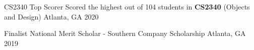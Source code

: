 




\begin{cvhonors}


\cvhonor
{CS2340 Top Scorer} %
{Scored the highest out of 104 students in \textbf{CS2340} (Objects and Design)} %
{Atlanta, GA} %
{2020} %

\cvhonor
{Finalist} %
{National Merit Scholar - Southern Company Scholarship} %
{Atlanta, GA} %
{2019} %






\end{cvhonors}






